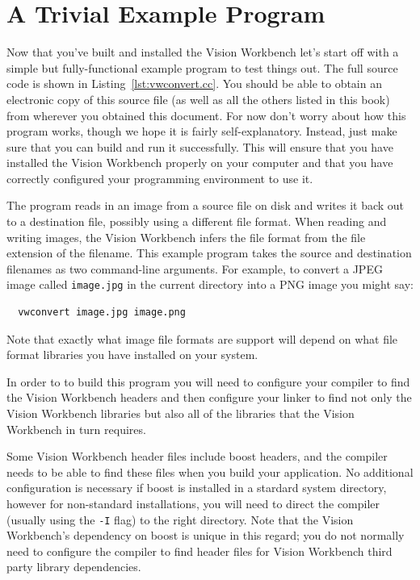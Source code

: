 \section{A Trivial Example Program}

Now that you've built and installed the Vision Workbench let's start
off with a simple but fully-functional example program to test things
out.  The full source code is shown in Listing~\ref{lst:vwconvert.cc}.
You should be able to obtain an electronic copy of this source file
(as well as all the others listed in this book) from wherever you
obtained this document.  For now don't worry about how this program
works, though we hope it is fairly self-explanatory.  Instead, just
make sure that you can build and run it successfully.  This will
ensure that you have installed the Vision Workbench properly on your
computer and that you have correctly configured your programming
environment to use it.


The program reads in an image from a source file on disk and writes it
back out to a destination file, possibly using a different file
format.  When reading and writing images, the Vision Workbench infers
the file format from the file extension of the filename.  This example
program takes the source and destination filenames as two command-line
arguments.  For example, to convert a JPEG image called
\verb#image.jpg# in the current directory into a PNG image you might
say:
\begin{verbatim}
  vwconvert image.jpg image.png
\end{verbatim}
Note that exactly what image file formats are support will depend on
what file format libraries you have installed on your system.

In order to to build this program you will need to configure your
compiler to find the Vision Workbench headers and then configure your
linker to find not only the Vision Workbench libraries but also all of
the libraries that the Vision Workbench in turn requires.  

Some Vision Workbench header files include boost headers, and the
compiler needs to be able to find these files when you build your
application.  No additional configuration is necessary if boost is
installed in a stardard system directory, however for non-standard
installations, you will need to direct the compiler (usually using the
\verb#-I# flag) to the right directory.  Note that the Vision
Workbench's dependency on boost is unique in this regard; you do not
normally need to configure the compiler to find header files for
Vision Workbench third party library dependencies.


